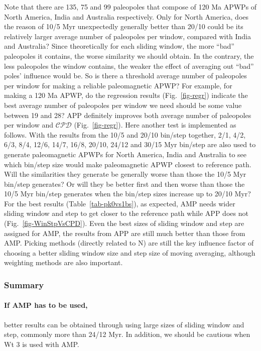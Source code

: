 Note that there are 135, 75 and 99 paleopoles that compose of 120 Ma
APWPs of North America, India and Australia respectively. Only for North
America, does the reason of 10/5 Myr unexpectedly generally better than 20/10
could be its relatively larger average number of paleopoles per window, compared
with India and Australia? Since theoretically for each sliding window, the more
``bad'' paleopoles it contains, the worse similarity we should obtain. In the
contrary, the less paleopoles the window contains, the weaker the effect of
averaging out ``bad'' poles' influence would be. So is there a threshold average
number of paleopoles per window for making a reliable paleomagnetic APWP\@? For
example, for making a 120 Ma APWP, do the regression results
(Fig.~\ref{fig-regr}) indicate the best average number of paleopoles per window
we need should be some value between 19 and 28? APP definitely improves both
average number of paleopoles per window and $\mathcal{CPD}$
(Fig.~\ref{fig-regr}). Here another test is implemented as follows. With the
results from the 10/5 and 20/10 bin/step together, 2/1, 4/2, 6/3, 8/4, 12/6,
14/7, 16/8, 20/10, 24/12 and 30/15 Myr bin/step are also used to generate
paleomagnetic APWPs for North America, India and Australia to see which bin/step
size would make paleomagnetic APWP closest to reference path. Will the
similarities they generate be generally worse than those the 10/5 Myr bin/step
generates? Or will they be better first and then worse than those the 10/5 Myr
bin/step generates when the bin/step sizes increase up to 20/10 Myr? For the
best results (Table~\ref{tab-pk0vs1bs}), as expected, AMP needs wider sliding
window and step to get closer to the reference path while APP does not
(Fig.~\ref{fig-WinStpVsCPD}). Even the best sizes of sliding window and step are
assigned for AMP, the results from APP are still much better than those from
AMP\@. Picking methods (directly related to N) are still the key influence
factor of choosing a better sliding window size and step size of moving
averaging, although weighting methods are also important.

\subsubsection{Summary}

\paragraph{If AMP has to be used,} better results can be obtained through
using large sizes of sliding window and step, commonly more than 24/12 Myr. In
addition, we should be cautious when Wt 3 is used with AMP\@.

